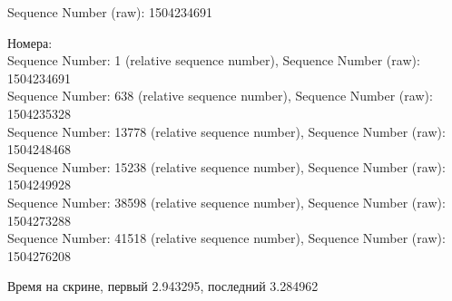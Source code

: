 \documentclass[a4paper,11pt]{article}
\begin{document}
Sequence Number (raw): 1504234691

\begin{center}
\label{fig:image}
\end{center}
Номера:\\
Sequence Number: 1    (relative sequence number), Sequence Number (raw): 1504234691\\
Sequence Number: 638    (relative sequence number), Sequence Number (raw): 1504235328\\
Sequence Number: 13778    (relative sequence number), Sequence Number (raw): 1504248468\\
Sequence Number: 15238    (relative sequence number), Sequence Number (raw): 1504249928\\
Sequence Number: 38598    (relative sequence number), Sequence Number (raw): 1504273288\\
Sequence Number: 41518    (relative sequence number), Sequence Number (raw): 1504276208

Время на скрине, первый 2.943295, последний 3.284962	
\end{document}
